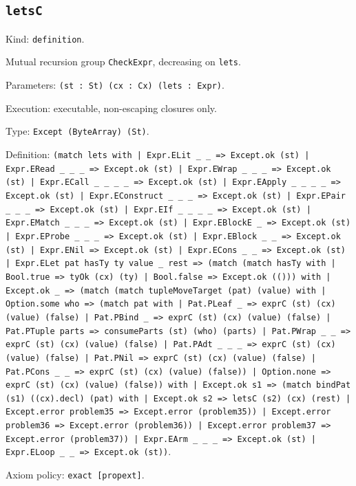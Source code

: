 \documentclass[11pt]{article}
\begin{document}
\subsection*{\texttt{letsC}}
\noindent Kind: \texttt{definition}.\par
\noindent Mutual recursion group \texttt{CheckExpr}, decreasing on \texttt{lets}.\par
\noindent Parameters: \texttt{(st : St) (cx : Cx) (lets : Expr)}.\par
\noindent Execution: executable, non-escaping closures only.\par
\noindent Type: \texttt{Except (ByteArray) (St)}.\par
\noindent Definition: \texttt{(match lets with | Expr.ELit \_ \_ => Except.ok (st) | Expr.ERead \_ \_ \_ => Except.ok (st) | Expr.EWrap \_ \_ \_ => Except.ok (st) | Expr.ECall \_ \_ \_ \_ => Except.ok (st) | Expr.EApply \_ \_ \_ \_ => Except.ok (st) | Expr.EConstruct \_ \_ \_ => Except.ok (st) | Expr.EPair \_ \_ \_ => Except.ok (st) | Expr.EIf \_ \_ \_ \_ => Except.ok (st) | Expr.EMatch \_ \_ \_ => Except.ok (st) | Expr.EBlockE \_ => Except.ok (st) | Expr.EProbe \_ \_ \_ => Except.ok (st) | Expr.EBlock \_ \_ => Except.ok (st) | Expr.ENil => Except.ok (st) | Expr.ECons \_ \_ => Except.ok (st) | Expr.ELet pat hasTy ty value \_ rest => (match (match hasTy with | Bool.true => tyOk (cx) (ty) | Bool.false => Except.ok (())) with | Except.ok \_ => (match (match tupleMoveTarget (pat) (value) with | Option.some who => (match pat with | Pat.PLeaf \_ => exprC (st) (cx) (value) (false) | Pat.PBind \_ => exprC (st) (cx) (value) (false) | Pat.PTuple parts => consumeParts (st) (who) (parts) | Pat.PWrap \_ \_ => exprC (st) (cx) (value) (false) | Pat.PAdt \_ \_ \_ => exprC (st) (cx) (value) (false) | Pat.PNil => exprC (st) (cx) (value) (false) | Pat.PCons \_ \_ => exprC (st) (cx) (value) (false)) | Option.none => exprC (st) (cx) (value) (false)) with | Except.ok s1 => (match bindPat (s1) ((cx).decl) (pat) with | Except.ok s2 => letsC (s2) (cx) (rest) | Except.error problem35 => Except.error (problem35)) | Except.error problem36 => Except.error (problem36)) | Except.error problem37 => Except.error (problem37)) | Expr.EArm \_ \_ \_ => Except.ok (st) | Expr.ELoop \_ \_ => Except.ok (st))}.\par
\noindent Axiom policy: \texttt{exact [propext]}.\par
\end{document}
